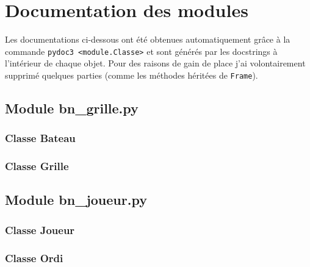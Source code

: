 \chapter{Documentation des modules}

Les documentations ci-dessous ont été obtenues automatiquement grâce à la commande \texttt{pydoc3 <module.Classe>} et sont générés par les docstrings à l'intérieur de chaque objet. 
%
Pour des raisons de gain de place j'ai volontairement supprimé quelques parties (comme les méthodes héritées de \texttt{Frame}).
\section{Module bn\_grille.py}
\subsection{Classe Bateau}



\subsection{Classe Grille}


\section{Module bn\_joueur.py}
\subsection{Classe Joueur}


\subsection{Classe Ordi}


